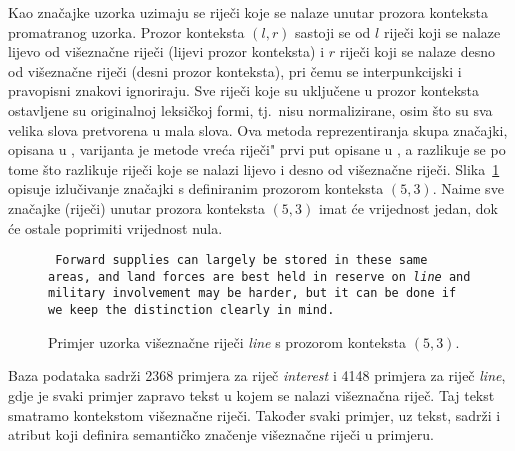 \documentclass[10pt, a4paper]{article}
\begin{document}
Kao značajke uzorka uzimaju se riječi koje se nalaze unutar prozora konteksta promatranog uzorka.
Prozor konteksta $(l,r)$  sastoji se
od $l$ riječi koji se nalaze lijevo od višeznačne riječi (lijevi prozor konteksta) 
i $r$ riječi koji se nalaze desno od višeznačne riječi (desni prozor konteksta), pri čemu se
interpunkcijski i pravopisni znakovi ignoriraju. Sve riječi koje su uključene u prozor konteksta ostavljene su originalnoj leksičkoj formi, tj.~nisu normalizirane, osim što su sva velika
slova pretvorena u mala slova. 
Ova metoda reprezentiranja skupa značajki,
opisana u \citep{pedersen}, varijanta je metode \grqq vreća riječi"  
prvi put opisane u \citep{gale-etc}, a razlikuje se po tome što razlikuje 
riječi koje se nalazi lijevo i desno od višeznačne riječi. \mbox{Slika \ref{window_of_context}}
opisuje izlučivanje značajki s definiranim prozorom konteksta $(5,3)$. Naime sve značajke (riječi)
unutar prozora konteksta $(5,3)$ imat će vrijednost jedan, dok će ostale poprimiti vrijednost nula.

\begin{figure}[!hbtp]
{\small \texttt{     Forward supplies can largely be stored in these same areas, and land forces are best held in reserve on  \emph{line}  and military involvement may be harder, but it can be done if we keep the distinction clearly in mind.}}
\caption{Primjer uzorka višeznačne riječi \emph{line} s prozorom konteksta $(5, 3)$.\label{window_of_context}}
\end{figure}

Baza podataka sadrži 2368 primjera za riječ \emph{interest} i 4148 primjera za riječ \emph{line},
gdje je svaki primjer zapravo tekst u kojem se nalazi višeznačna riječ. Taj tekst smatramo
kontekstom višeznačne riječi. Također svaki primjer, uz tekst, sadrži i atribut koji 
definira semantičko značenje višeznačne riječi u primjeru.


\end{document}
